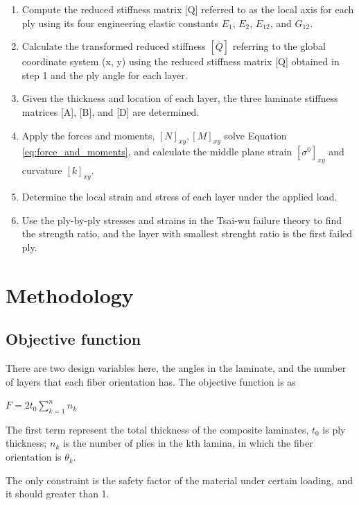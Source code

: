 \documentclass{article}
\begin{document}
\begin{enumerate}
\item Compute the reduced stiffness matrix [Q] referred to as the local axis for each ply using its four engineering elastic constants $E_1 $, $E_2 $, $E_{12} $, and $G_{12} $.

\item Calculate the transformed reduced stiffness $[\bar{Q}] $ referring to the global coordinate system (x, y) using the reduced stiffness matrix [Q] obtained in step 1 and the ply angle for each layer.

\item  Given the thickness and location of each layer, the three laminate stiffness matrices [A], [B], and [D] are determined.

\item  Apply the forces and moments, $[N]_{xy}, [M]_{xy} $ solve
Equation \ref{eq:force_and_moments}, and calculate the middle plane strain $[\sigma ^{0}]_{xy} $ and curvature $[k]_{xy} $.

\item Determine the local strain and stress of each layer under the applied load.

\item  Use the ply-by-ply stresses and strains in the Tsai-wu failure theory to find the strength
	ratio, and the layer with smallest strenght ratio is the first failed ply. 
\end{enumerate}




\section{Methodology}
\subsection{Objective function}
There are two design variables here, the angles in the laminate, and the number of layers that each
fiber orientation has. The objective function is as

$F  = 2t_0 \sum_{k=1}^n n_k$ 

The first term represent the total thickness of the composite laminates, $t_0$ is ply thickness;
$n_k$ is the number of plies in the kth lamina, in which the fiber orientation is $\theta_k$.

The only constraint is the safety factor of the material under certain loading, and it should
greater than 1.
\end{document}
